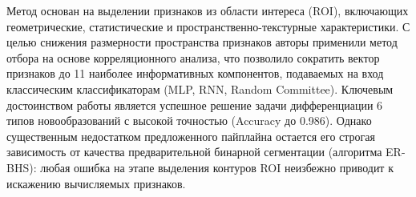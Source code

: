 \documentclass[eqsecnum, authorsinfo]{kioj6}
\begin{document}


Метод \cite{2} основан на выделении признаков из области интереса (ROI), включающих геометрические, статистические и пространственно-текстурные характеристики. 
С целью снижения размерности пространства признаков авторы применили метод отбора на основе корреляционного анализа, что позволило сократить вектор признаков 
до 11 наиболее информативных компонентов, подаваемых на вход классическим классификаторам (MLP, RNN, Random Committee). Ключевым достоинством работы 
является успешное решение задачи дифференциации 6 типов новообразований с высокой точностью (Accuracy до 0.986). Однако существенным недостатком предложенного 
пайплайна остается его строгая зависимость от качества предварительной бинарной сегментации (алгоритма ER-BHS): любая ошибка на этапе выделения контуров ROI 
неизбежно приводит к искажению вычисляемых признаков.


\end{document}
